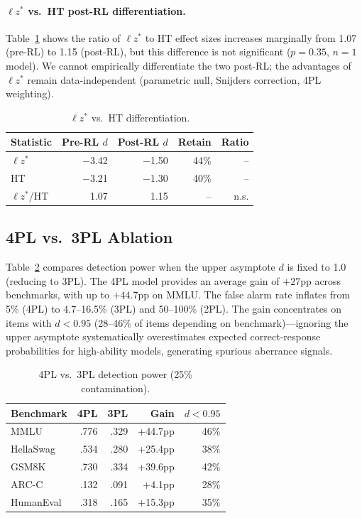 \documentclass[11pt,twocolumn]{article}
\newcommand{\lzs}{\ensuremath{\ell z^*}}
\begin{document}
\paragraph{$\lzs$ vs.\ HT post-RL differentiation.}
Table~\ref{tab:ht_diff} shows the ratio of $\lzs$ to HT effect sizes increases marginally from 1.07 (pre-RL) to 1.15 (post-RL), but this difference is not significant ($p = 0.35$, $n = 1$ model). We cannot empirically differentiate the two post-RL; the advantages of $\lzs$ remain data-independent (parametric null, Snijders correction, 4PL weighting).

\begin{table}[t]
\centering
\caption{$\lzs$ vs.\ HT differentiation.}
\label{tab:ht_diff}
\footnotesize
\begin{tabular}{lrrrr}
\toprule
Statistic & Pre-RL $d$ & Post-RL $d$ & Retain & Ratio \\
\midrule
$\lzs$ & $-$3.42 & $-$1.50 & 44\% & -- \\
HT & $-$3.21 & $-$1.30 & 40\% & -- \\
$\lzs$/HT & 1.07 & 1.15 & -- & n.s. \\
\bottomrule
\end{tabular}
\vspace{-0.3cm}
\end{table}

\subsection{4PL vs.\ 3PL Ablation}

Table~\ref{tab:4pl_ablation} compares detection power when the upper asymptote $d$ is fixed to 1.0 (reducing to 3PL). The 4PL model provides an average gain of $+27$pp across benchmarks, with up to $+44.7$pp on MMLU. The false alarm rate inflates from 5\% (4PL) to 4.7--16.5\% (3PL) and 50--100\% (2PL). The gain concentrates on items with $d < 0.95$ (28--46\% of items depending on benchmark)---ignoring the upper asymptote systematically overestimates expected correct-response probabilities for high-ability models, generating spurious aberrance signals.

\begin{table}[t]
\centering
\caption{4PL vs.\ 3PL detection power (25\% contamination).}
\label{tab:4pl_ablation}
\footnotesize
\begin{tabular}{lrrrr}
\toprule
Benchmark & 4PL & 3PL & Gain & $d{<}0.95$ \\
\midrule
MMLU & .776 & .329 & +44.7pp & 46\% \\
HellaSwag & .534 & .280 & +25.4pp & 38\% \\
GSM8K & .730 & .334 & +39.6pp & 42\% \\
ARC-C & .132 & .091 & +4.1pp & 28\% \\
HumanEval & .318 & .165 & +15.3pp & 35\% \\
\bottomrule
\end{tabular}
\vspace{-0.3cm}
\end{table}
\end{document}
